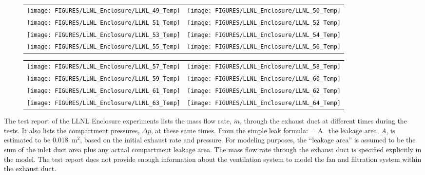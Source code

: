 \begin{figure}[p]
\begin{tabular*}{\textwidth}{l@{\extracolsep{\fill}}r}
\texttt{[image: FIGURES/LLNL\_Enclosure/LLNL\_49\_Temp]} &
\texttt{[image: FIGURES/LLNL\_Enclosure/LLNL\_50\_Temp]} \\
\texttt{[image: FIGURES/LLNL\_Enclosure/LLNL\_51\_Temp]} &
\texttt{[image: FIGURES/LLNL\_Enclosure/LLNL\_52\_Temp]} \\
\texttt{[image: FIGURES/LLNL\_Enclosure/LLNL\_53\_Temp]} &
\texttt{[image: FIGURES/LLNL\_Enclosure/LLNL\_54\_Temp]} \\
\texttt{[image: FIGURES/LLNL\_Enclosure/LLNL\_55\_Temp]} &
\texttt{[image: FIGURES/LLNL\_Enclosure/LLNL\_56\_Temp]}
\end{tabular*}
\label{LLNL_Enclosure_Temp_7}
\end{figure}

\begin{figure}[p]
\begin{tabular*}{\textwidth}{l@{\extracolsep{\fill}}r}
\texttt{[image: FIGURES/LLNL\_Enclosure/LLNL\_57\_Temp]} &
\texttt{[image: FIGURES/LLNL\_Enclosure/LLNL\_58\_Temp]} \\
\texttt{[image: FIGURES/LLNL\_Enclosure/LLNL\_59\_Temp]} &
\texttt{[image: FIGURES/LLNL\_Enclosure/LLNL\_60\_Temp]} \\
\texttt{[image: FIGURES/LLNL\_Enclosure/LLNL\_61\_Temp]} &
\texttt{[image: FIGURES/LLNL\_Enclosure/LLNL\_62\_Temp]} \\
\texttt{[image: FIGURES/LLNL\_Enclosure/LLNL\_63\_Temp]} &
\texttt{[image: FIGURES/LLNL\_Enclosure/LLNL\_64\_Temp]}
\end{tabular*}
\label{LLNL_Enclosure_Temp_8}
\end{figure}

\clearpage

The test report of the LLNL Enclosure experiments lists the mass flow rate, $\dot{m}$, through the exhaust duct at different times during the tests. It also lists the compartment pressures, $\Delta p$, at these same times. From the simple leak formula:
\be
    = A \, 
\ee
the leakage area, $A$, is estimated to be 0.018~m$^2$, based on the initial exhaust rate and pressure. For modeling purposes, the ``leakage area'' is assumed to be the sum of the inlet duct area plus any actual compartment leakage area. The mass flow rate through the exhaust duct is specified explicitly in the model. The test report does not provide enough information about the ventilation system to model the fan and filtration system within the exhaust duct.

